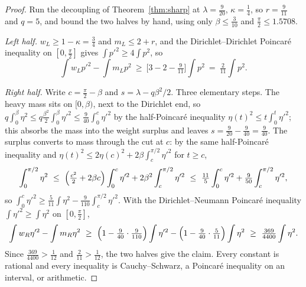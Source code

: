 \documentclass[11pt]{article}
\theoremstyle{definition}
\begin{document}
\begin{proof}
Run the decoupling of Theorem~\ref{thm:sharp} at $\lambda=\tfrac9{20}$,
$\kappa=\tfrac14$, so $r=\tfrac9{11}$ and $q=5$, and bound the two halves by hand,
using only $\beta\le\tfrac3{10}$ and $\tfrac\pi2\le1.5708$.

\emph{Left half.} $w_L\ge1-\kappa=\tfrac34$ and $m_L\le2+r$, and the
Dirichlet--Dirichlet Poincar\'e inequality on $[0,\tfrac\pi2]$ gives
$\int p'^2\ge4\int p^2$, so
\[
  \int w_Lp'^2-\int m_Lp^2\ \ge\ \bigl[3-2-\tfrac9{11}\bigr]\int p^2
  \ =\ \tfrac2{11}\int p^2 .
\]

\emph{Right half.} Write $c=\tfrac\pi2-\beta$ and $s=\lambda-q\beta^2/2$. Three
elementary steps. The heavy mass sits on $[0,\beta)$, next to the Dirichlet end, so
$q\int_0^\beta\eta^2\le q\tfrac{\beta^2}2\int_0^\beta\eta'^2\le\tfrac9{40}
\int_0^{c}\eta'^2$ by the half-Poincar\'e inequality
$\eta(t)^2\le t\int_0^t\eta'^2$; this absorbs the mass into the weight surplus and
leaves $s=\tfrac9{20}-\tfrac9{40}=\tfrac9{40}$. The surplus converts to mass through
the cut at $c$: by the same half-Poincar\'e inequality and
$\eta(t)^2\le2\eta(c)^2+2\beta\int_c^{\pi/2}\eta'^2$ for $t\ge c$,
\[
  \int_0^{\pi/2}\eta^2\ \le\ \Bigl(\tfrac{c^2}2+2\beta c\Bigr)\int_0^{c}\eta'^2
  +2\beta^2\int_c^{\pi/2}\eta'^2\ \le\ \tfrac{11}5\int_0^{c}\eta'^2
  +\tfrac9{50}\int_c^{\pi/2}\eta'^2 ,
\]
so $\int_0^{c}\eta'^2\ge\tfrac5{11}\int\eta^2-\tfrac9{110}\int_c^{\pi/2}\eta'^2$.
With the Dirichlet--Neumann Poincar\'e inequality $\int\eta'^2\ge\int\eta^2$ on
$[0,\tfrac\pi2]$,
\[
  \int w_R\eta'^2-\int m_R\eta^2\ \ge\
  \Bigl(1-\tfrac9{40}\cdot\tfrac9{110}\Bigr)\int\eta'^2
  -\Bigl(1-\tfrac9{40}\cdot\tfrac5{11}\Bigr)\int\eta^2
  \ \ge\ \tfrac{369}{4400}\int\eta^2 .
\]
Since $\tfrac{369}{4400}>\tfrac1{12}$ and $\tfrac2{11}>\tfrac1{12}$, the two halves give
the claim. Every constant is rational and every inequality is Cauchy--Schwarz, a
Poincar\'e inequality on an interval, or arithmetic.
\end{proof}
\end{document}
